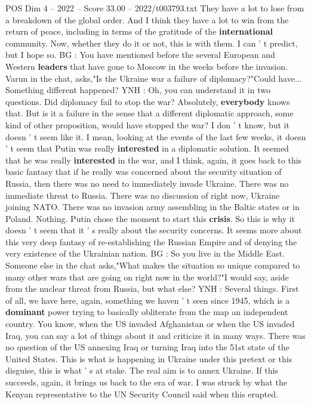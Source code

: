 \begin{textsample}{POS Dim 4 – 2022 – Score 33.00 – 2022/t003793.txt}
They have a lot to lose from a breakdown of the global order.
And I think they have a lot to win from the return of peace, including in terms of the gratitude of the \textbf{international} community.
Now, whether they do it or not, this is with them.
I can ' t predict, but I hope so.
BG : You have mentioned before the several European and Western \textbf{leaders} that have gone to Moscow in the weeks before the invasion.
Varun in the chat, asks,"Is the Ukraine war a failure of diplomacy?"Could have...
Something different happened?
YNH : Oh, you can understand it in two questions.
Did diplomacy fail to stop the war?
Absolutely, \textbf{everybody} knows that.
But is it a failure in the sense that a different diplomatic approach, some kind of other proposition, would have stopped the war?
I don ' t know, but it doesn ' t seem like it.
I mean, looking at the events of the last few weeks, it doesn ' t seem that Putin was really \textbf{interested} in a diplomatic solution.
It seemed that he was really \textbf{interested} in the war, and I think, again, it goes back to this basic fantasy that if he really was concerned about the security situation of Russia, then there was no need to immediately invade Ukraine.
There was no immediate threat to Russia.
There was no discussion of right now, Ukraine joining NATO.
There was no invasion army assembling in the Baltic states or in Poland.
Nothing.
Putin chose the moment to start this \textbf{crisis}.
So this is why it doesn ' t seem that it ' s really about the security concerns.
It seems more about this very deep fantasy of re-establishing the Russian Empire and of denying the very existence of the Ukrainian nation.
BG : So you live in the Middle East.
Someone else in the chat asks,"What makes the situation so unique compared to many other wars that are going on right now in the world?"I would say, aside from the nuclear threat from Russia, but what else?
YNH : Several things.
First of all, we have here, again, something we haven ' t seen since 1945, which is a \textbf{dominant} power trying to basically obliterate from the map an independent country.
You know, when the US invaded Afghanistan or when the US invaded Iraq, you can say a lot of things about it and criticize it in many ways.
There was no question of the US annexing Iraq or turning Iraq into the 51st state of the United States.
This is what is happening in Ukraine under this pretext or this disguise, this is what ' s at stake.
The real aim is to annex Ukraine.
If this succeeds, again, it brings us back to the era of war.
I was struck by what the Kenyan representative to the UN Security Council said when this erupted.

\end{textsample}
